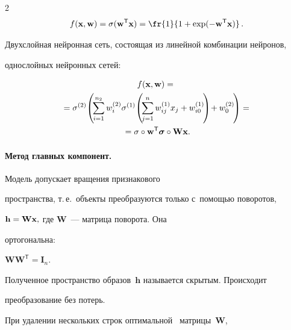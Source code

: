\begin{multicols}{2}
\begin{equation}
f(\xb,\wm)=\sigma(\wm^\mathsf{T}\xb)=\fr{1}{1+\exp(-\wm^\mathsf{T}\xb)}\,.


\end{equation}





Двухслойная нейронная сеть, состоящая из линейной комбинации нейронов, 


однослойных нейронных сетей:


\begin{multline*}




f(\xb,\wm)={}\\


{}=\sigma^{(2)}\!\left(\!\sum\limits_{i=1}^{n_2}w_i^{(2)}\sigma^{(1)}


\!\left(\!


\sum\limits_{j=1}^{n}w_{ij}^{(1)}x_j+w_{i0}^{(1)}\!\right)\!+w_0^{(2)}\!\right) = {}\\


{}=


\sigma\circ \wm^{\mathsf{T}}\sigmab\circ \mathbf{W}\xb.


\end{multline*}





\paragraph*{Метод главных компонент.} Модель допускает вращения признакового 


пространства, т.\,е.\ объекты преобразуются только с~помощью поворотов, 


$\mathbf{h} = \mathbf{W}{\mathbf{x}},$ где $\mathbf{W}$~--- матрица поворота. Она 


ортогональна:




$\mathbf{W}\mathbf{W}^\mathsf{T} = \mathbf{I}_n.$




Полученное пространство образов~$\mathbf{h}$ называется скрытым. Происходит 


преобразование без потерь.





При удалении нескольких строк оптимальной~\cite{fourth} матрицы~$\mathbf{W}$, 



\end{multicols}
